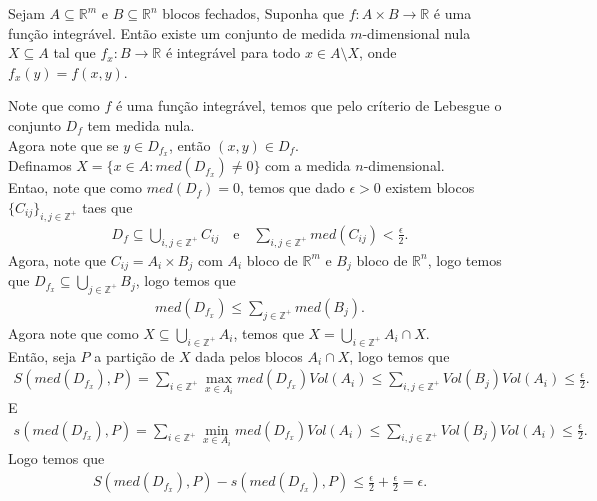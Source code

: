 \begin{homeworkProblem}[Seção 4-3]
  Sejam $A\subseteq \mathbb{R}^{m}$ e $B\subseteq \mathbb{R}^{n}$ blocos fechados, Suponha que $f:A\times B\to\mathbb{R}$ é uma função integrável. Então existe um conjunto de medida $m$-dimensional nula $X\subseteq A$ tal que $f_x:B\to\mathbb{R}$ é integrável para todo $x\in A\setminus X$, onde $f_x(y)=f(x,y)$. 
  \begin{solution}
    Note que como $f$ é uma função integrável, temos que pelo críterio de Lebesgue o conjunto $D_f$ tem medida nula.\\
    Agora note que se $y\in D_{f_x}$, então $(x,y)\in D_{f}$.\\
    Definamos $X=\{x\in A: med(D_{f_x})\neq 0\}$ com a medida $n$-dimensional.\\
    Entao, note que como $med(D_f)=0$, temos que dado $\epsilon>0$ existem blocos $\{C_{ij}\}_{i,j\in\mathbb{Z}^{+}}$ taes que
    \begin{align*}
      D_f\subseteq \bigcup_{i,j\in\mathbb{Z}^{+}}C_{ij}\quad\text{e}\quad \sum_{i,j\in\mathbb{Z}^{+}}med(C_{ij})<\frac{\epsilon}{2}.
    \end{align*}
    Agora, note que $C_{ij}=A_i\times B_j$ com $A_i$ bloco de $\mathbb{R}^{m}$ e $B_j$ bloco de $\mathbb{R}^{n}$, logo temos que $D_{f_x}\subseteq\bigcup_{j\in\mathbb{Z}^{+}}B_j$, logo temos que
    \begin{align*}
      med(D_{f_x})\leq\sum_{j\in\mathbb{Z}^{+}}med(B_j).
    \end{align*}
    Agora note que como $X\subseteq \bigcup_{i\in\mathbb{Z}^{+}}A_i$, temos que $X=\bigcup_{i\in\mathbb{Z}^{+}}A_i\cap X$.\\
    Então, seja $P$ a partição de $X$ dada pelos blocos $A_i\cap X$, logo temos que 
    \begin{align*}
      S(med(D_{f_{x}}),P)=\sum_{i\in\mathbb{Z}^{+}}\max_{x\in A_i}med(D_{f_x})Vol(A_i)\leq\sum_{i,j\in\mathbb{Z}^{+}}Vol(B_j)Vol(A_i)\leq\frac{\epsilon}{2}.
    \end{align*}
    E
    \begin{align*}
      s(med(D_{f_{x}}),P)=\sum_{i\in\mathbb{Z}^{+}}\min_{x\in A_i}med(D_{f_x})Vol(A_i)\leq\sum_{i,j\in\mathbb{Z}^{+}}Vol(B_j)Vol(A_i)\leq\frac{\epsilon}{2}.
    \end{align*}
    Logo temos que
    \begin{align*}
      S(med(D_{f_x}),P)-s(med(D_{f_x}),P)\leq \frac{\epsilon}{2}+\frac{\epsilon}{2}=\epsilon.
    \end{align*}

\end{solution}
\end{homeworkProblem}

